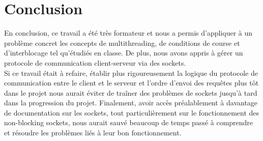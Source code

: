 \documentclass[11pt]{article}
\begin{document}
\section*{ Conclusion }
\setlength{\parindent}{20pt}
En conclusion, ce travail a été très formateur et nous a permis d’appliquer à un problème concret les concepts de multithreading, de conditions de course et 
d’interblocage tel qu’étudiés en classe. De plus, nous avons appris à gérer un protocole de communication client-serveur via des sockets. 
\\
Si ce travail était à refaire, établir plus rigoureusement la logique du protocole de communication entre le client et le serveur et l’ordre d’envoi des requêtes 
plus tôt dans le projet nous aurait éviter de traîner des problèmes de sockets jusqu’à tard dans la progression du projet.  Finalement, avoir accès préalablement à 
davantage de documentation sur les sockets, tout particulièrement sur le fonctionnement des non-blocking sockets, nous aurait sauvé beaucoup de temps passé à 
comprendre et résoudre les problèmes liés à leur bon fonctionnement.
\\
\end{document}
